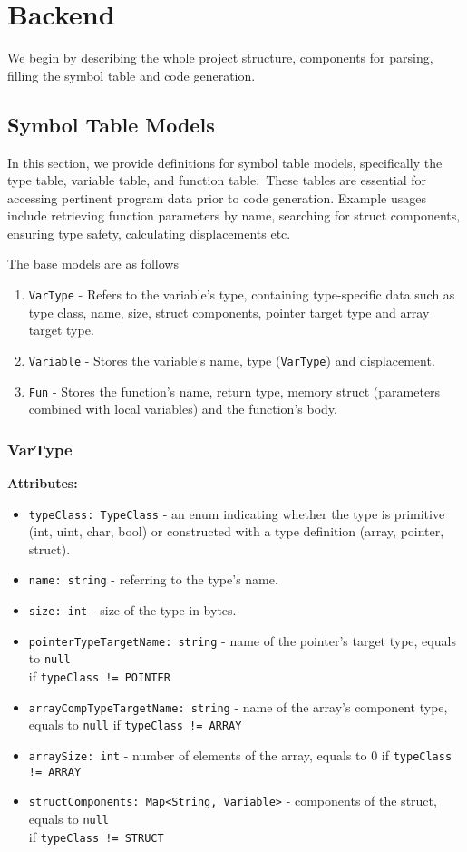 \chapter{Backend}\label{ch:backend}
We begin by describing the whole project structure, components for parsing,
filling the symbol table and code generation.


\section{Symbol Table Models}\label{sec:symbol_table_models}
In this section, we provide definitions for symbol table models, specifically the type table, variable table, and function table.\
These tables are essential for accessing pertinent program data prior to code generation.
Example usages include retrieving function parameters by name, searching for struct components, ensuring type safety, calculating displacements etc.

The base models are as follows
\begin{enumerate}
    \item \verb+VarType+ - Refers to the variable's type, containing type-specific data such as type class, name,
    size, struct components, pointer target type and array target type.
    \item \verb+Variable+ - Stores the variable's name, type (\verb+VarType+) and displacement.
    \item \verb+Fun+ - Stores the function's name, return type, memory struct (parameters combined with local variables) and the function's body.
\end{enumerate}

\subsection{VarType}\label{subsec:vartype}
\textbf{Attributes:}
\begin{itemize}
    \item \verb+typeClass: TypeClass+ - an enum indicating whether the type is primitive (int, uint, char, bool) or constructed with
    a type definition (array, pointer, struct).
    \item \verb+name: string+ - referring to the type's name.
    \item \verb+size: int+ - size of the type in bytes.
    \item \verb+pointerTypeTargetName: string+ - name of the pointer's target type, equals to \verb+null+\\ if \verb+typeClass != POINTER+
    \item \verb+arrayCompTypeTargetName: string+ - name of the array's component type, equals to \verb+null+ if \verb+typeClass != ARRAY+
    \item \verb+arraySize: int+ - number of elements of the array, equals to 0 if \verb+typeClass != ARRAY+
    \item \verb+structComponents: Map<String, Variable>+ - components of the struct, equals to \verb+null+\\ if \verb+typeClass != STRUCT+
\end{itemize}

